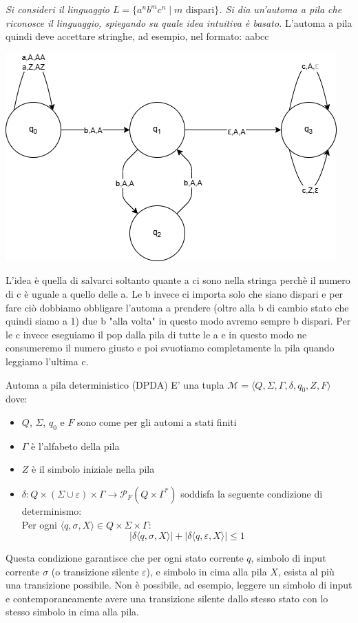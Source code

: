 \documentclass[12pt, a4paper]{report}
\begin{document}
            \begin{exercise}
                \textit{Si consideri il linguaggio $L=\{a^nb^mc^n\mid m \text{ dispari}\}$. Si dia un'automa a pila che riconosce il linguaggio, spiegando su quale idea intuitiva è basato.}
                L'automa a pila quindi deve accettare stringhe, ad esempio, nel formato: aabcc
                \begin{center}
                    \includegraphics[width=.5\textwidth]{Images/esautomaapila.png}
                \end{center} 
                L'idea è quella di salvarci soltanto quante a ci sono nella stringa perchè il numero di c è uguale a quello delle a. Le b invece ci importa solo che siano dispari e per fare ciò dobbiamo obbligare l'automa a prendere (oltre alla b di cambio stato che quindi siamo a 1) due b "alla volta" in questo modo avremo sempre b dispari. Per le c invece eseguiamo il pop dalla pila di tutte le a e in questo modo ne consumeremo il numero giusto e poi svuotiamo completamente la pila quando leggiamo l'ultima c.
            \end{exercise}
            \begin{definitionbox}{Automa a pila deterministico (DPDA)}{}
                 E' una tupla $\mathcal{M} = \langle Q, \Sigma, \Gamma, \delta, q_0, Z, F \rangle$ dove: \begin{itemize}
                    \item $Q$, $\Sigma$, $q_0$ e $F$ sono come per gli automi a stati finiti
                    \item $\Gamma$ è l'alfabeto della pila
                    \item $Z$ è il simbolo iniziale nella pila
                    \item $\delta : Q \times (\Sigma \cup {\varepsilon}) \times \Gamma \to \mathcal{P}_F(Q \times \Gamma^*)$ soddisfa la seguente condizione di determinismo:
                    \\Per ogni $\langle q, \sigma, X \rangle \in Q \times \Sigma \times \Gamma$: $$|\delta\langle q, \sigma, X \rangle| + |\delta\langle q, \varepsilon, X \rangle| \le 1$$
                 \end{itemize}
                 Questa condizione garantisce che per ogni stato corrente $q$, simbolo di input corrente $\sigma$ (o transizione silente $\varepsilon$), e simbolo in cima alla pila $X$, esista al più una transizione possibile. Non è possibile, ad esempio, leggere un simbolo di input e contemporaneamente avere una transizione silente dallo stesso stato con lo stesso simbolo in cima alla pila.
            \end{definitionbox}
\end{document}
